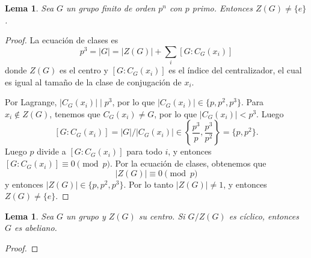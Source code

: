 \documentclass{article}
\newtheorem{lemma}[theorem]{Lema}
\theoremstyle{definition}
\theoremstyle{remark}
\numberwithin{equation}{section}
\newcommand{\abs}[1]{\left| #1 \right|}
\newcommand{\set}[1]{\left\{ #1 \right\}}
\begin{document}
\begin{lemma}
    Sea $G$ un grupo finito de orden $p^n$ con $p$ primo. Entonces $Z(G) \neq \{e\}$.
\end{lemma}
\begin{proof}
    La ecuación de clases es
    \[p^3 = \abs G = \abs{Z(G)} + \sum_i [G \colon C_G(x_i)]\]
    donde $Z(G)$ es el centro y $[G \colon C_G(x_i)]$ es el índice del centralizador, el cual es igual al tamaño de la clase de conjugación de $x_i$.

    Por Lagrange, $\abs{C_G(x_i)} \mid p^3$, por lo que $\abs{C_G(x_i)} \in \{p,p^2,p^3\}$. Para $x_i \notin Z(G)$, tenemos que $C_G(x_i) \neq G$, por lo que $\abs{C_G(x_i)} < p^3$. Luego
    \[[G \colon C_G(x_i)] = \abs G / \abs{C_G(x_i)} \in \set{\frac{p^3}{p}, \frac{p^3}{p^2}} = \{p,p^2\}.\]
    Luego $p$ divide a $[G \colon C_G(x_i)]$ para todo $i$, y entonces $[G \colon C_G(x_i)] \equiv 0 \pmod p$. Por la ecuación de clases, obtenemos que
    \[\abs{Z(G)} \equiv 0 \pmod p\]
    y entonces $\abs{Z(G)} \in \{p, p^2, p^3\}$. Por lo tanto $\abs{Z(G)} \neq 1$, y entonces $Z(G) \neq \{e\}$.
\end{proof}

\begin{lemma}
    Sea $G$ un grupo y $Z(G)$ su centro. Si $G/Z(G)$ es cíclico, entonces $G$ es abeliano.
\end{lemma}
\begin{proof}
    
\end{proof}
\end{document}
